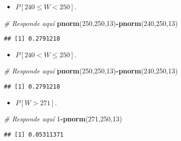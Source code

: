 \documentclass[
]{article}
\newenvironment{Shaded}{\begin{snugshade}}{\end{snugshade}}
\newcommand{\CommentTok}[1]{\textcolor[rgb]{0.56,0.35,0.01}{\textit{#1}}}
\newcommand{\DecValTok}[1]{\textcolor[rgb]{0.00,0.00,0.81}{#1}}
\newcommand{\KeywordTok}[1]{\textcolor[rgb]{0.13,0.29,0.53}{\textbf{#1}}}
\newcommand{\NormalTok}[1]{#1}
\newcommand{\OperatorTok}[1]{\textcolor[rgb]{0.81,0.36,0.00}{\textbf{#1}}}
\providecommand{\tightlist}{%
  \setlength{\itemsep}{0pt}\setlength{\parskip}{0pt}}
\begin{document}
\begin{itemize}
\tightlist
\item
  \(P[240 \leq W < 250]\).
\end{itemize}

\begin{Shaded}
\begin{Highlighting}[]
\CommentTok{# Responde aquí}
\KeywordTok{pnorm}\NormalTok{(}\DecValTok{250}\NormalTok{,}\DecValTok{250}\NormalTok{,}\DecValTok{13}\NormalTok{)}\OperatorTok{-}\KeywordTok{pnorm}\NormalTok{(}\DecValTok{240}\NormalTok{,}\DecValTok{250}\NormalTok{,}\DecValTok{13}\NormalTok{)}
\end{Highlighting}
\end{Shaded}

\begin{verbatim}
## [1] 0.2791218
\end{verbatim}

\begin{itemize}
\tightlist
\item
  \(P[240 < W \leq 250]\).
\end{itemize}

\begin{Shaded}
\begin{Highlighting}[]
\CommentTok{# Responde aquí}
\KeywordTok{pnorm}\NormalTok{(}\DecValTok{250}\NormalTok{,}\DecValTok{250}\NormalTok{,}\DecValTok{13}\NormalTok{)}\OperatorTok{-}\KeywordTok{pnorm}\NormalTok{(}\DecValTok{240}\NormalTok{,}\DecValTok{250}\NormalTok{,}\DecValTok{13}\NormalTok{)}
\end{Highlighting}
\end{Shaded}

\begin{verbatim}
## [1] 0.2791218
\end{verbatim}

\begin{itemize}
\tightlist
\item
  \(P [W > 271]\).
\end{itemize}

\begin{Shaded}
\begin{Highlighting}[]
\CommentTok{# Responde aquí}
\DecValTok{1}\OperatorTok{-}\KeywordTok{pnorm}\NormalTok{(}\DecValTok{271}\NormalTok{,}\DecValTok{250}\NormalTok{,}\DecValTok{13}\NormalTok{)}
\end{Highlighting}
\end{Shaded}

\begin{verbatim}
## [1] 0.05311371
\end{verbatim}
\end{document}
